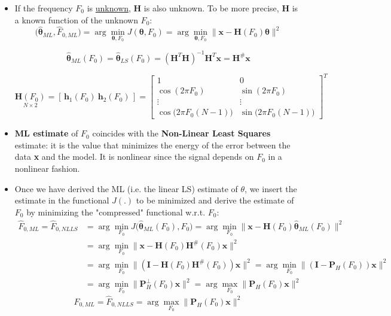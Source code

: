 \begin{itemize}
    \item If the frequency \(F_0\) is \underline{unknown}, \textbf{H} is also unknown. To be more precise, \textbf{H} is a known function of the unknown \(F_0\):
\[
\big(\hat{\boldsymbol{\theta}}_{ML},\hat{F}_{0,ML}\big)
= \arg\min_{\boldsymbol{\theta},F_{0}} J(\boldsymbol{\theta},F_{0})
= \arg\min_{\boldsymbol{\theta},F_{0}}
\big\|\mathbf{x} - \mathbf{H}(F_{0})\boldsymbol{\theta}\big\|^{2}
\]

\[
\hat{\boldsymbol{\theta}}_{ML}(F_{0})
= \hat{\boldsymbol{\theta}}_{LS}(F_{0})
= (\mathbf{H}^{T}\mathbf{H})^{-1}\mathbf{H}^{T}\mathbf{x}
= \mathbf{H}^{\#}\mathbf{x}
\]

\[
\underset{N\times 2}{\mathbf{H}(F_{0})}
= [\,\mathbf{h}_{1}(F_{0})\ \mathbf{h}_{2}(F_{0})\,]
=
\begin{bmatrix}
1 & 0 \\
\cos(2\pi F_{0}) & \sin(2\pi F_{0}) \\
\vdots & \vdots \\
\cos\big(2\pi F_{0}(N-1)\big) &
\sin\big(2\pi F_{0}(N-1)\big)
\end{bmatrix}^{T}
\]

    \item \textbf{ML estimate} of \(F_0\) coincides with the \textbf{Non-Linear Least Squares} estimate: it is the value that minimizes the energy of the error between the data \textbf{x} and the model. It is nonlinear since the signal depends on \(F_0\) in a nonlinear fashion.
    \item Once we have derived the ML (i.e. the linear LS) estimate of \(\theta\), we insert the estimate in the functional \(J(.)\) to be minimized and derive the estimate of \(F_0\) by minimizing the "compressed" functional w.r.t. \(F_0\):
\begin{align*}
\hat{F}_{0,ML}
= \hat{F}_{0,NLLS}
&= \arg\min_{F_{0}} J\big(\hat{\boldsymbol{\theta}}_{ML}(F_{0}),F_{0}\big)
 = \arg\min_{F_{0}}\big\|\mathbf{x}-\mathbf{H}(F_{0})\hat{\boldsymbol{\theta}}_{ML}(F_{0})\big\|^{2} \\[4pt]
&= \arg\min_{F_{0}}\big\|\mathbf{x}-\mathbf{H}(F_{0})\mathbf{H}^{\#}(F_{0})\mathbf{x}\big\|^{2} \\[4pt]
&= \arg\min_{F_{0}}\big\|(\mathbf{I}-\mathbf{H}(F_{0})\mathbf{H}^{\#}(F_{0}))\mathbf{x}\big\|^{2} = \arg\min_{F_{0}}\big\|(\mathbf{I}-\mathbf{P}_{H}(F_{0}))\mathbf{x}\big\|^{2} \\[4pt]
&= \arg\min_{F_{0}}\big\|\mathbf{P}_{H}^{\perp}(F_{0})\mathbf{x}\big\|^{2} = \arg\max_{F_{0}}\big\|\mathbf{P}_{H}(F_{0})\mathbf{x}\big\|^{2}
\end{align*}
\[
\hat{F}_{0,ML}
= \hat{F}_{0,NLLS}
= \arg\max_{F_{0}}
\big\|\mathbf{P}_{H}(F_{0})\mathbf{x}\big\|^{2}
\]


\end{itemize}
